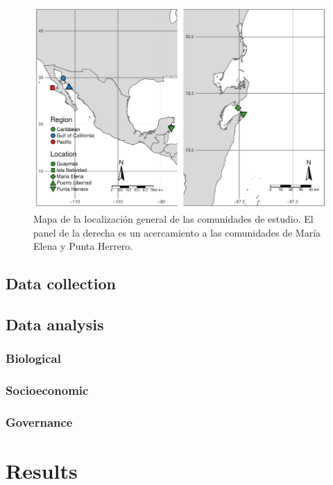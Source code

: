 \documentclass{frontiersSCNS}
\begin{document}
\begin{figure}
\centering
\includegraphics{Villasenor-Derbez_files/figure-latex/unnamed-chunk-2-1.pdf}
\caption{\label{fig:unnamed-chunk-2}Mapa de la localización general de las
comunidades de estudio. El panel de la derecha es un acercamiento a las
comunidades de María Elena y Punta Herrero.}
\end{figure}

\subsection{Data collection}\label{data-collection}

\subsection{Data analysis}\label{data-analysis}

\subsubsection{Biological}\label{biological}

\subsubsection{Socioeconomic}\label{socioeconomic}

\subsubsection{Governance}\label{governance}

\section{Results}\label{results}
\end{document}
